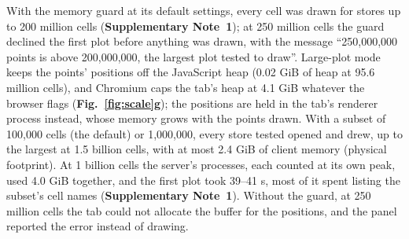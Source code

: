 \documentclass[11pt]{article}
\begin{document}
With the memory guard at its default settings, every cell was drawn for stores up to 200 million cells (\textbf{Supplementary Note~1}); at 250 million cells the guard declined the first plot before anything was drawn, with the message ``250,000,000 points is above 200,000,000, the largest plot tested to draw''. Large-plot mode keeps the points' positions off the JavaScript heap (0.02 GiB of heap at 95.6 million cells), and Chromium caps the tab's heap at 4.1 GiB whatever the browser flags (\textbf{Fig.~\ref{fig:scale}g}); the positions are held in the tab's renderer process instead, whose memory grows with the points drawn. With a subset of 100,000 cells (the default) or 1,000,000, every store tested opened and drew, up to the largest at 1.5 billion cells, with at most 2.4 GiB of client memory (physical footprint). At 1 billion cells the server's processes, each counted at its own peak, used 4.0 GiB together, and the first plot took 39--41 s, most of it spent listing the subset's cell names (\textbf{Supplementary Note~1}). Without the guard, at 250 million cells the tab could not allocate the buffer for the positions, and the panel reported the error instead of drawing.




\end{document}

